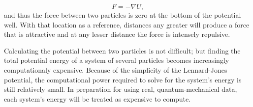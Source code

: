 \begin{equation} \label{eq:forceEq}
F = -\nabla U,
\end{equation}
and thus the force between two particles is zero at the bottom of the potential well. With that location as a reference, distances any greater will produce a force that is attractive and at any lesser distance the force is intensely repulsive.
\par Calculating the potential between two particles is not difficult; but finding the total potential energy of a system of several particles becomes increasingly computationaly expensive. Because of the simplicity of the Lennard-Jones potential, the computational power required to solve for the system's energy is still relatively small. In preparation for using real, quantum-mechanical data, each system's energy will be treated as expensive to compute. 




